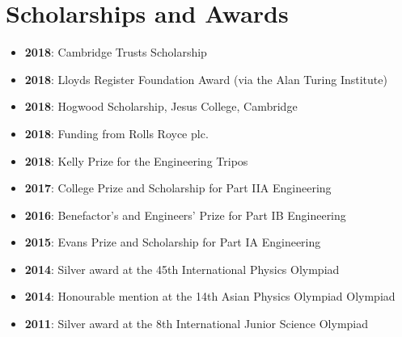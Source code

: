 \documentclass[letterpaper,11pt,oneside]{article}
\begin{document}
\section*{Scholarships and Awards}
\begin{itemize}
\item \textbf{2018}: Cambridge Trusts Scholarship 
\item \textbf{2018}: Lloyds Register Foundation Award (via the Alan Turing Institute)
\item \textbf{2018}: Hogwood Scholarship, Jesus College, Cambridge
\item \textbf{2018}: Funding from Rolls Royce plc. 
\item \textbf{2018}: Kelly Prize for the Engineering Tripos
\item \textbf{2017}: College Prize and Scholarship for Part IIA Engineering
\item \textbf{2016}: Benefactor’s and Engineers’ Prize for Part IB Engineering
\item \textbf{2015}: Evans Prize and Scholarship for Part IA Engineering
\item \textbf{2014}: Silver award at the 45th International Physics Olympiad
\item \textbf{2014}: Honourable mention at the 14th Asian Physics Olympiad Olympiad
\item \textbf{2011}: Silver award at the 8th International Junior Science Olympiad
\end{itemize}
\end{document}
